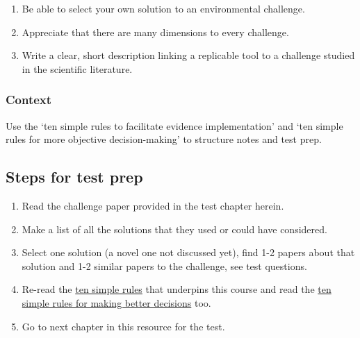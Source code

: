 \documentclass[
]{book}
\providecommand{\tightlist}{%
  \setlength{\itemsep}{0pt}\setlength{\parskip}{0pt}}
\begin{document}
\begin{enumerate}
\def\labelenumi{\arabic{enumi}.}
\tightlist
\item
  Be able to select your own solution to an environmental challenge.
\item
  Appreciate that there are many dimensions to every challenge.\\
\item
  Write a clear, short description linking a replicable tool to a challenge studied in the scientific literature.
\end{enumerate}

\hypertarget{context-4}{%
\subsubsection*{Context}\label{context-4}}

Use the `ten simple rules to facilitate evidence implementation' \citep{RN6861} and `ten simple rules for more objective decision-making' \citep{RN7223} to structure notes and test prep.

\hypertarget{steps-for-test-prep}{%
\subsection*{Steps for test prep}\label{steps-for-test-prep}}

\begin{enumerate}
\def\labelenumi{\arabic{enumi}.}
\tightlist
\item
  Read the challenge paper provided in the test chapter herein.\\
\item
  Make a list of all the solutions that they used or could have considered.
\item
  Select one solution (a novel one not discussed yet), find 1-2 papers about that solution and 1-2 similar papers to the challenge, see test questions.\\
\item
  Re-read the \href{https://www.facetsjournal.com/doi/10.1139/facets-2020-0021}{ten simple rules} that underpins this course and read the \href{https://journals.plos.org/ploscompbiol/article?id=10.1371/journal.pcbi.1007706}{ten simple rules for making better decisions} too.
\item
  Go to next chapter in this resource for the test.
\end{enumerate}
\end{document}

